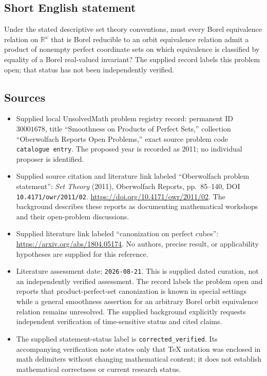 \documentclass[11pt]{article}
\newcommand{\R}{\mathbb{R}}
\begin{document}
\subsection{Short English statement}
Under the stated descriptive set theory conventions, must every Borel equivalence relation on \(\R^\omega\) that is Borel reducible to an orbit equivalence relation admit a product of nonempty perfect coordinate sets on which equivalence is classified by equality of a Borel real-valued invariant? The supplied record labels this problem open; that status has not been independently verified.
\subsection{Sources}
\begin{itemize}
\item Supplied local UnsolvedMath problem registry record: permanent ID \(30001678\), title ``Smoothness on Products of Perfect Sets,'' collection ``Oberwolfach Reports Open Problems,'' exact source problem code \texttt{catalogue entry}. The proposed year is recorded as 2011; no individual proposer is identified.
\item Supplied source citation and literature link labeled ``Oberwolfach problem statement'': \emph{Set Theory} (2011), Oberwolfach Reports, pp.\ 85--140, DOI \texttt{10.4171/owr/2011/02}. \url{https://doi.org/10.4171/owr/2011/02}. The background describes these reports as documenting mathematical workshops and their open-problem discussions.
\item Supplied literature link labeled ``canonization on perfect cubes'': \url{https://arxiv.org/abs/1804.05174}. No authors, precise result, or applicability hypotheses are supplied for this reference.
\item Literature assessment date: \texttt{2026-08-21}. This is supplied dated curation, not an independently verified assessment. The record labels the problem open and reports that product-perfect-set canonization is known in special settings while a general smoothness assertion for an arbitrary Borel orbit equivalence relation remains unresolved. The supplied background explicitly requests independent verification of time-sensitive status and cited claims.
\item The supplied statement-status label is \texttt{corrected\_verified}. Its accompanying verification note states only that TeX notation was enclosed in math delimiters without changing mathematical content; it does not establish mathematical correctness or current research status.
\end{itemize}
\end{document}
